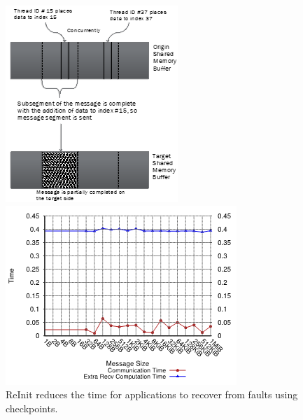 \begin{figure}
\centering
\begin{minipage}[c]{0.20\textwidth}
\captionsetup{width=\textwidth,font=small,labelfont=bf} %
\caption{ReInit reduces the time for applications to recover from faults using checkpoints.}
\label{fig:partitioned-communications}
\end{minipage}
\qquad
\begin{minipage}[c]{0.20\textwidth}
\includegraphics[width=\textwidth]{projects/2.3.1-PMR/2.3.1.17-OMPI-X/partitioned-communications-partial-sends.png}
\end{minipage}
\qquad
\begin{minipage}[c]{0.33\textwidth}
\includegraphics[width=\textwidth]{projects/2.3.1-PMR/2.3.1.17-OMPI-X/partitioned-communications-early-receive.png}
\end{minipage}
\end{figure}


